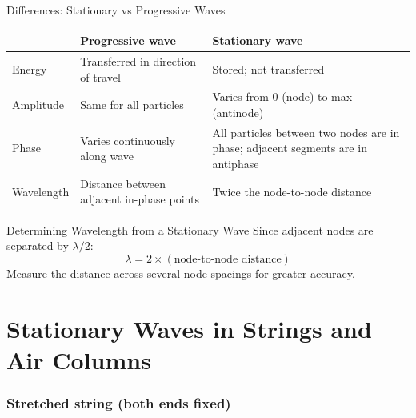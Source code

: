 \begin{keybox}{Differences: Stationary vs Progressive Waves}
\begin{center}
\renewcommand{\arraystretch}{1.4}
\begin{tabular}{@{} l p{4.5cm} p{4.5cm} @{}}
\toprule
 & \textbf{Progressive wave} & \textbf{Stationary wave} \\
\midrule
Energy & Transferred in direction of travel & Stored; not transferred \\
Amplitude & Same for all particles & Varies from 0 (node) to max (antinode) \\
Phase & Varies continuously along wave & All particles between two nodes are in phase; adjacent segments are in antiphase \\
Wavelength & Distance between adjacent in-phase points & Twice the node-to-node distance \\
\bottomrule
\end{tabular}
\end{center}
\end{keybox}

\begin{keybox}{Determining Wavelength from a Stationary Wave}
Since adjacent nodes are separated by $\lambda/2$:
$$\lambda = 2 \times (\text{node-to-node distance})$$
Measure the distance across several node spacings for greater accuracy.
\end{keybox}

\section{Stationary Waves in Strings and Air Columns}

\subsubsection*{Stretched string (both ends fixed)}

